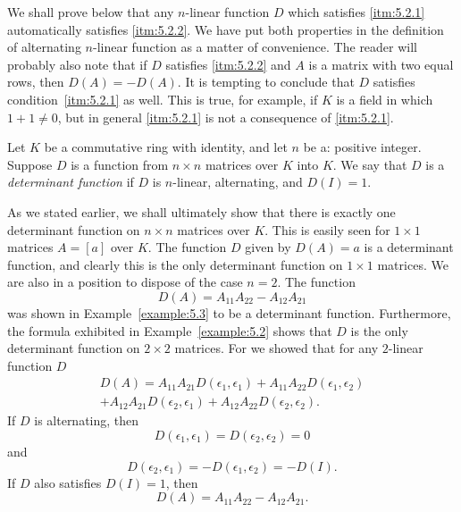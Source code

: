 We shall prove below that any \(n\)-linear function \(D\) which satisfies \ref{itm:5.2.1} automatically satisfies \ref{itm:5.2.2}. We have put both properties in the definition of alternating \(n\)-linear function as a matter of convenience. The reader will probably also note that if \(D\) satisfies \ref{itm:5.2.2} and \(A\) is a matrix with two equal rows, then \(D\left(A\right)=-D\left(A\right)\). It is tempting to conclude that \(D\) satisfies condition~\ref{itm:5.2.1} as well. This is true, for example, if \(K\) is a field in which \(1+1\ne0\), but in general \ref{itm:5.2.1} is not a consequence of \ref{itm:5.2.1}.

\begin{definition}
    Let \(K\) be a commutative ring with identity, and let \(n\) be a: positive integer. Suppose \(D\) is a function from \(n\times n\) matrices over \(K\) into \(K\). We say that \(D\) is a \emph{determinant function} if \(D\) is \(n\)-linear, alternating, and \(D\left(I\right)=1\).
\end{definition}

As we stated earlier, we shall ultimately show that there is exactly one determinant function on \(n\times n\) matrices over \(K\). This is easily seen for \(1\times1\) matrices \(A=\left[a\right]\) over \(K\). The function \(D\) given by \(D\left(A\right)=a\) is a determinant function, and clearly this is the only determinant function on \(1\times 1\) matrices. We are also in a position to dispose of the case \(n=2\). The function
\begin{equation}
    D\left(A\right)=A_{11}A_{22}-A_{12}A_{21}
\end{equation}
was shown in Example~\ref{example:5.3} to be a determinant function. Furthermore, the formula exhibited in Example~\ref{example:5.2} shows that \(D\) is the only determinant function on \(2\times2\) matrices. For we showed that for any \(2\)-linear function \(D\)
\begin{multline*}
    D\left(A\right)=A_{11}A_{21}D\left(\epsilon_1,\epsilon_1\right)+A_{11}A_{22}D\left(\epsilon_1,\epsilon_2\right)\\
    +A_{12}A_{21}D\left(\epsilon_2,\epsilon_1\right)+A_{12}A_{22}D\left(\epsilon_2,\epsilon_2\right).
\end{multline*}
If \(D\) is alternating, then
\begin{equation*}
    D\left(\epsilon_1,\epsilon_1\right)=D\left(\epsilon_2,\epsilon_2\right)=0
\end{equation*}
and
\begin{equation*}
    D\left(\epsilon_2,\epsilon_1\right)=-D\left(\epsilon_1,\epsilon_2\right)=-D\left(I\right).
\end{equation*}
If \(D\) also satisfies \(D\left(I\right)=1\), then
\begin{equation*}
    D\left(A\right)=A_{11}A_{22}-A_{12}A_{21}.
\end{equation*}


